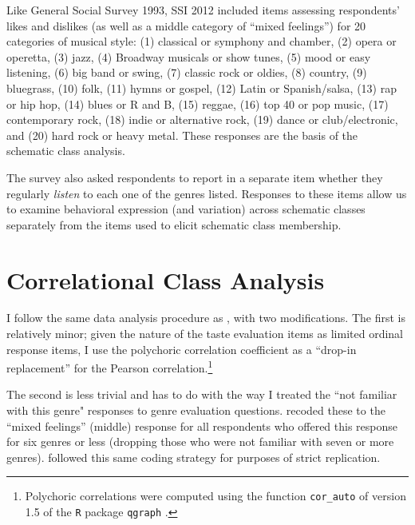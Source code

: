 \documentclass[preprint, authoryear,11pt, 3p]{elsarticle}
\begin{document}
Like General Social Survey 1993, SSI 2012 included items assessing respondents’ likes and dislikes (as well as a middle category of ``mixed feelings'') for 20 categories of musical style: (1) classical or symphony and chamber, (2) opera or operetta, (3) jazz, (4) Broadway musicals or show tunes, (5) mood or easy listening, (6) big band or swing, (7) classic rock or oldies, (8) country, (9) bluegrass, (10) folk, (11) hymns or gospel, (12) Latin or Spanish/salsa, (13) rap or hip hop, (14) blues or R and B, (15) reggae, (16) top 40 or pop music, (17) contemporary rock, (18) indie or alternative rock, (19) dance or club/electronic, and (20) hard rock or heavy metal. These responses are the basis of the schematic class analysis. 

The survey also asked respondents to report in a separate item whether they regularly {\em listen} to each one of the genres listed. Responses to these items allow us to examine behavioral expression (and variation) across schematic classes separately from the items used to elicit schematic class membership.

\section{Correlational Class Analysis}
I follow the same data analysis procedure as \citet{boutyline2017improving}, with two modifications. The first is relatively minor; given the nature of the taste evaluation items as limited ordinal response items, I use the polychoric correlation coefficient as a ``drop-in replacement'' \citep[386]{boutyline2017improving} for the Pearson correlation.\footnote{Polychoric correlations were computed using the function \texttt{cor\_auto} of version 1.5 of the \texttt{R} package \texttt{qgraph} \citep{epskamp2012qgraph}.}

The second is less trivial and has to do with the way I treated the ``not familiar with this genre" responses to genre evaluation questions.  \citet{goldberg2011mapping} recoded these to the ``mixed feelings'' (middle) response for all respondents who offered this response for six genres or less (dropping those who were not familiar with seven or more genres). \citet{boutyline2017improving} followed this same coding strategy for purposes of strict replication. 
\end{document}
